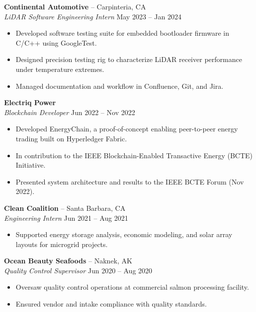 \documentclass[a4paper,10pt]{article}
\begin{document}
\textbf{Continental Automotive} – Carpinteria, CA\\
\textit{LiDAR Software Engineering Intern} \hfill May 2023 – Jan 2024
\begin{itemize}[leftmargin=1em, itemsep=0.5pt]
\item Developed software testing suite for embedded bootloader firmware in C/C++ using GoogleTest.
\item Designed precision testing rig to characterize LiDAR receiver performance under temperature extremes.
\item Managed documentation and workflow in Confluence, Git, and Jira.
\end{itemize}

\textbf{Electriq Power}\\
\textit{Blockchain Developer} \hfill Jun 2022 – Nov 2022
\begin{itemize}[leftmargin=1em, itemsep=0.5pt]
\item Developed EnergyChain, a proof-of-concept enabling peer-to-peer energy trading built on Hyperledger Fabric.
\item In contribution to the IEEE Blockchain-Enabled Transactive Energy (BCTE) Initiative.
\item Presented system architecture and results to the IEEE BCTE Forum (Nov 2022).
\end{itemize}

\textbf{Clean Coalition} – Santa Barbara, CA\\
\textit{Engineering Intern} \hfill Jun 2021 – Aug 2021
\begin{itemize}[leftmargin=1em, itemsep=0.5pt]
\item Supported energy storage analysis, economic modeling, and solar array layouts for microgrid projects.
\end{itemize}

\textbf{Ocean Beauty Seafoods} – Naknek, AK\\
\textit{Quality Control Supervisor} \hfill Jun 2020 – Aug 2020
\begin{itemize}[leftmargin=1em, itemsep=0.5pt]
\item Oversaw quality control operations at commercial salmon processing facility.
\item Ensured vendor and intake compliance with quality standards.
\end{itemize}
\end{document}
